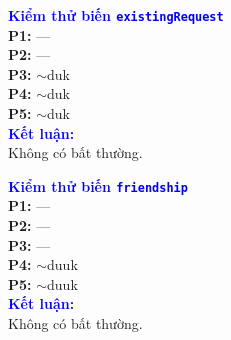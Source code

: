 \documentclass[11pt,a4paper]{article}
\begin{document}
\medskip
\noindent
\begin{minipage}[t]{0.485\textwidth}
\begin{tcolorbox}[colback=white, colframe=darkblue!35, boxrule=0.6pt, arc=2pt, left=4pt, right=4pt, top=4pt, bottom=4pt]
\begin{minipage}[t]{0.41\linewidth}
\scriptsize
\textbf{\textcolor{blue}{Kiểm thử biến \texttt{existingRequest}}}\\[4pt]
\textbf{P1:} ---\\
\textbf{P2:} ---\\
\textbf{P3:} $\sim$duk\\
\textbf{P4:} $\sim$duk\\
\textbf{P5:} $\sim$duk\\[6pt]
\textbf{\textcolor{blue}{Kết luận:}}\\
Không có bất thường.
\end{minipage}\hfill
\begin{minipage}[t]{0.57\linewidth}
\centering
\def\lblStart{}%
\def\lblFone{}%
\def\lblFtwo{}%
\def\lblFthree{}%
\def\lblFfour{}%
\def\lblFfive{}%
\def\lblFsix{}%
\def\lblFseven{}%
\def\lblFeight{d(req)}%
\def\lblFnine{u(req)}%
\def\lblFten{}%
\def\lblFeleven{}%
\def\lblFtwelve{}%
\def\lblFthirteen{}%
\def\lblFfourteen{}%
\resizebox{\linewidth}{!}{\DrawFriendRequestVarDFG}
\end{minipage}
\end{tcolorbox}
\end{minipage}\hfill
\begin{minipage}[t]{0.485\textwidth}
\begin{tcolorbox}[colback=white, colframe=darkblue!35, boxrule=0.6pt, arc=2pt, left=4pt, right=4pt, top=4pt, bottom=4pt]
\begin{minipage}[t]{0.41\linewidth}
\scriptsize
\textbf{\textcolor{blue}{Kiểm thử biến \texttt{friendship}}}\\[4pt]
\textbf{P1:} ---\\
\textbf{P2:} ---\\
\textbf{P3:} ---\\
\textbf{P4:} $\sim$duuk\\
\textbf{P5:} $\sim$duuk\\[6pt]
\textbf{\textcolor{blue}{Kết luận:}}\\
Không có bất thường.
\end{minipage}\hfill
\begin{minipage}[t]{0.57\linewidth}
\centering
\def\lblStart{}%
\def\lblFone{}%
\def\lblFtwo{}%
\def\lblFthree{}%
\def\lblFfour{}%
\def\lblFfive{}%
\def\lblFsix{}%
\def\lblFseven{}%
\def\lblFeight{}%
\def\lblFnine{}%
\def\lblFten{}%
\def\lblFeleven{d(fr)}%
\def\lblFtwelve{u(fr)}%
\def\lblFthirteen{}%
\def\lblFfourteen{u(fr)}%
\resizebox{\linewidth}{!}{\DrawFriendRequestVarDFG}
\end{minipage}
\end{tcolorbox}
\end{minipage}
\end{document}
